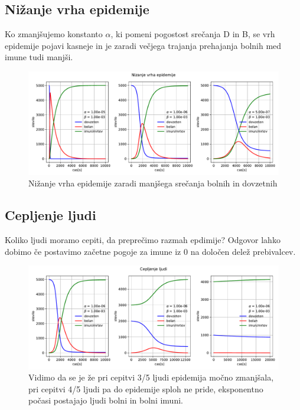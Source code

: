 \documentclass[11pt, a4paper]{article}
\begin{document}
\subsection{Nižanje vrha epidemije}
Ko zmanjšujemo konstanto $\alpha$, ki pomeni pogostost srečanja D in B, se vrh epidemije pojavi kasneje in je zaradi večjega trajanja prehajanja bolnih med imune tudi manjši.
\begin{figure}[htb!]
  \centering
  \includegraphics[width=18cm]{nizanje_vrha_zaradi_alfa.pdf}
  \caption{Nižanje vrha epidemije zaradi manjšega srečanja bolnih in dovzetnih}
\end{figure}
\subsection{Cepljenje ljudi}
Koliko ljudi moramo cepiti, da preprečimo razmah epdimije? Odgovor lahko dobimo če postavimo začetne pogoje za imune iz 0 na določen delež prebivalcev.
\begin{figure}[htb!]
  \centering
  \includegraphics[width=18cm]{cepljenje_ljudi.pdf}
  \caption{Vidimo da se je že pri cepitvi 3/5 ljudi epidemija močno zmanjšala, pri cepitvi 4/5 ljudi pa do epidemije sploh ne pride, eksponentno počasi postajajo ljudi bolni in bolni imuni.}
\end{figure}
\end{document}

